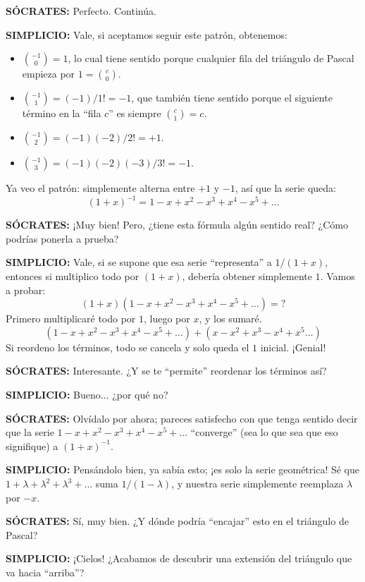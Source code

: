 \noindent \textbf{SÓCRATES:} Perfecto. Continúa.

\noindent \textbf{SIMPLICIO:} Vale, si aceptamos seguir este patrón,
obtenemos:
\begin{itemize}
\item $\binom{-1}{0} = 1$, lo cual tiene sentido porque cualquier fila
  del triángulo de Pascal empieza por $1 = \binom{c}{0}$.
\item $\binom{-1}{1} = (-1)/1! = -1$, que también tiene sentido porque
  el siguiente término en la ``fila $c$'' es siempre $\binom{c}{1} = c$.
\item $\binom{-1}{2} = (-1)(-2)/2! = +1$.
\item $\binom{-1}{3} = (-1)(-2)(-3)/3! = -1$.
\end{itemize}
Ya veo el patrón: simplemente alterna entre $+1$ y $-1$, así que la
serie queda:
\[ (1 + x)^{-1} = 1 - x + x^2 - x^3 + x^4 - x^5 + \dots \]

\noindent \textbf{SÓCRATES:} ¡Muy bien! Pero, ¿tiene esta fórmula algún
sentido real? ¿Cómo podrías ponerla a prueba?

\noindent \textbf{SIMPLICIO:} Vale, si se supone que esa serie
``representa'' a $1/(1 + x)$, entonces si multiplico todo por $(1 + x)$,
debería obtener simplemente $1$. Vamos a probar:
\[ (1 + x)(1 - x + x^2 - x^3 + x^4 - x^5 + \dots) = ? \]
Primero multiplicaré todo por $1$, luego por $x$, y los sumaré.
\[ (1 - x + x^2 - x^3 + x^4 - x^5 + \dots) + (x - x^2 + x^3 - x^4 + x^5 \dots) \]
Si reordeno los términos, todo se cancela y solo queda el $1$
inicial. ¡Genial!

\noindent \textbf{SÓCRATES:} Interesante. ¿Y se te ``permite'' reordenar
los términos así?

\noindent \textbf{SIMPLICIO:} Bueno... ¿por qué no?

\noindent \textbf{SÓCRATES:} Olvídalo por ahora; pareces satisfecho con
que tenga sentido decir que la serie
$1 - x + x^2 - x^3 + x^4 - x^5 + \dots$ ``converge'' (sea lo que sea que
eso signifique) a $(1 + x)^{-1}$.

\noindent \textbf{SIMPLICIO:} Pensándolo bien, ya sabía esto; ¡es solo
la serie geométrica! Sé que
$1 + \lambda + \lambda^2 + \lambda^3 + \dots$ suma $1/(1 - \lambda)$, y nuestra serie
simplemente reemplaza $\lambda$ por $-x$.

\noindent \textbf{SÓCRATES:} Sí, muy bien. ¿Y dónde podría ``encajar''
esto en el triángulo de Pascal?

\noindent \textbf{SIMPLICIO:} ¡Cielos! ¿Acabamos de descubrir una
extensión del triángulo que va hacia ``arriba''?

